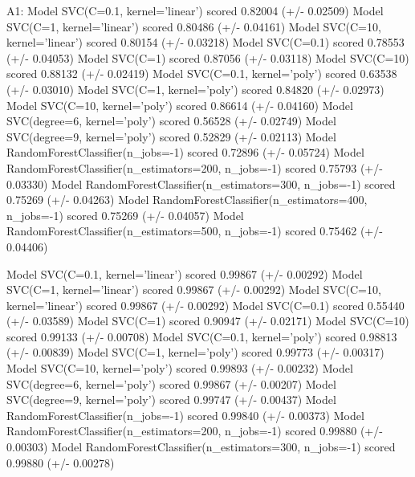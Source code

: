 \documentclass[a4paper,11pt]{article}
\begin{document}
\iffalse
A1:
Model SVC(C=0.1, kernel='linear') scored 0.82004 (+/- 0.02509)
Model SVC(C=1, kernel='linear') scored 0.80486 (+/- 0.04161)
Model SVC(C=10, kernel='linear') scored 0.80154 (+/- 0.03218)
Model SVC(C=0.1) scored 0.78553 (+/- 0.04053)
Model SVC(C=1) scored 0.87056 (+/- 0.03118)
Model SVC(C=10) scored 0.88132 (+/- 0.02419)
Model SVC(C=0.1, kernel='poly') scored 0.63538 (+/- 0.03010)
Model SVC(C=1, kernel='poly') scored 0.84820 (+/- 0.02973)
Model SVC(C=10, kernel='poly') scored 0.86614 (+/- 0.04160)
Model SVC(degree=6, kernel='poly') scored 0.56528 (+/- 0.02749)
Model SVC(degree=9, kernel='poly') scored 0.52829 (+/- 0.02113)
Model RandomForestClassifier(n_jobs=-1) scored 0.72896 (+/- 0.05724)
Model RandomForestClassifier(n_estimators=200, n_jobs=-1) scored 0.75793 (+/- 0.03330)
Model RandomForestClassifier(n_estimators=300, n_jobs=-1) scored 0.75269 (+/- 0.04263)
Model RandomForestClassifier(n_estimators=400, n_jobs=-1) scored 0.75269 (+/- 0.04057)
Model RandomForestClassifier(n_estimators=500, n_jobs=-1) scored 0.75462 (+/- 0.04406)

Model SVC(C=0.1, kernel='linear') scored 0.99867 (+/- 0.00292)
Model SVC(C=1, kernel='linear') scored 0.99867 (+/- 0.00292)
Model SVC(C=10, kernel='linear') scored 0.99867 (+/- 0.00292)
Model SVC(C=0.1) scored 0.55440 (+/- 0.03589)
Model SVC(C=1) scored 0.90947 (+/- 0.02171)
Model SVC(C=10) scored 0.99133 (+/- 0.00708)
Model SVC(C=0.1, kernel='poly') scored 0.98813 (+/- 0.00839)
Model SVC(C=1, kernel='poly') scored 0.99773 (+/- 0.00317)
Model SVC(C=10, kernel='poly') scored 0.99893 (+/- 0.00232)
Model SVC(degree=6, kernel='poly') scored 0.99867 (+/- 0.00207)
Model SVC(degree=9, kernel='poly') scored 0.99747 (+/- 0.00437)
Model RandomForestClassifier(n_jobs=-1) scored 0.99840 (+/- 0.00373)
Model RandomForestClassifier(n_estimators=200, n_jobs=-1) scored 0.99880 (+/- 0.00303)
Model RandomForestClassifier(n_estimators=300, n_jobs=-1) scored 0.99880 (+/- 0.00278)
\end{document}
